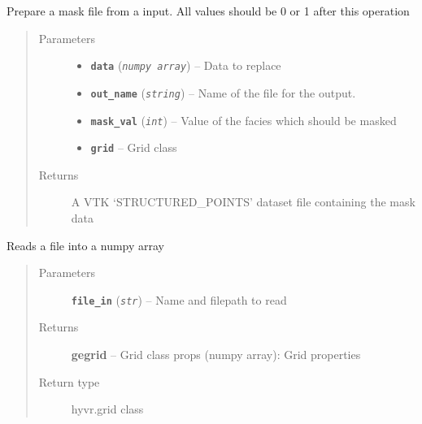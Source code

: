 \documentclass[letterpaper,10pt,english]{sphinxmanual}
\begin{document}
\begin{fulllineitems}
\label{hyvr:hyvr.hyvr.utils.vtk_mask}
Prepare a mask file from a  input. All values should be 0 or 1 after this operation
\begin{quote}\begin{description}
\item[{Parameters}] \leavevmode\begin{itemize}
\item {} 
\textbf{\texttt{data}} (\emph{\texttt{numpy array}}) -- Data to replace

\item {} 
\textbf{\texttt{out\_name}} (\emph{\texttt{string}}) -- Name of the file for the output.

\item {} 
\textbf{\texttt{mask\_val}} (\emph{\texttt{int}}) -- Value of the facies which should be masked

\item {} 
\textbf{\texttt{grid}} -- Grid class

\end{itemize}

\item[{Returns}] \leavevmode
A VTK `STRUCTURED\_POINTS' dataset file containing the mask data

\end{description}\end{quote}

\end{fulllineitems}


\begin{fulllineitems}
\label{hyvr:hyvr.hyvr.utils.vtk_read}
Reads a  file into a numpy array
\begin{quote}\begin{description}
\item[{Parameters}] \leavevmode
\textbf{\texttt{file\_in}} (\emph{\texttt{str}}) -- Name and filepath to read

\item[{Returns}] \leavevmode
\textbf{gegrid} -- Grid class
props (numpy array):            Grid properties

\item[{Return type}] \leavevmode
hyvr.grid class

\end{description}\end{quote}

\end{fulllineitems}
\end{document}

